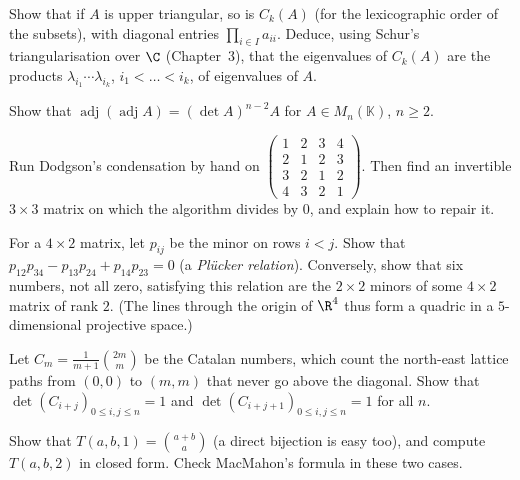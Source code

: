 \begin{exercise}[$\star$]\label{ex:compoundeig}
Show that if $A$ is upper triangular, so is $C_k(A)$ (for the lexicographic order of the subsets), with diagonal entries
$\prod_{i\in I}a_{ii}$. Deduce, using Schur's triangularisation over $\C$ (Chapter~3), that the eigenvalues of $C_k(A)$ are the
products $\lambda_{i_1}\cdots\lambda_{i_k}$, $i_1<\dots<i_k$, of eigenvalues of $A$.
\end{exercise}

\begin{exercise}[$\star\star$]\label{ex:adjadj}
Show that $\operatorname{adj}(\operatorname{adj}A)=(\det A)^{n-2}A$ for $A\in M_n(\mathbb K)$, $n\ge2$.
\end{exercise}

\begin{exercise}[$\star$]\label{ex:dodgson}
Run Dodgson's condensation by hand on $\begin{pmatrix}1&2&3&4\\2&1&2&3\\3&2&1&2\\4&3&2&1\end{pmatrix}$. Then find an invertible
$3\times3$ matrix on which the algorithm divides by $0$, and explain how to repair it.
\end{exercise}

\begin{exercise}[$\star\star$]\label{ex:plucker}
For a $4\times2$ matrix, let $p_{ij}$ be the minor on rows $i<j$. Show that $p_{12}p_{34}-p_{13}p_{24}+p_{14}p_{23}=0$ (a
\emph{Pl\"ucker relation}). Conversely, show that six numbers, not all zero, satisfying this relation are the $2\times2$ minors
of some $4\times2$ matrix of rank $2$. (The lines through the origin of $\R^4$ thus form a quadric in a $5$-dimensional
projective space.)
\end{exercise}

\begin{exercise}[$\star\star$]\label{ex:catalan}
Let $C_m=\frac1{m+1}\binom{2m}m$ be the Catalan numbers, which count the north-east lattice paths from $(0,0)$ to $(m,m)$
that never go above the diagonal. Show that $\det(C_{i+j})_{0\le i,j\le n}=1$ and $\det(C_{i+j+1})_{0\le i,j\le n}=1$
for all $n$.
\end{exercise}

\begin{exercise}[$\star\star$]\label{ex:hex2}
Show that $T(a,b,1)=\binom{a+b}a$ (a direct bijection is easy too), and compute $T(a,b,2)$ in closed form. Check MacMahon's
formula in these two cases.
\end{exercise}

